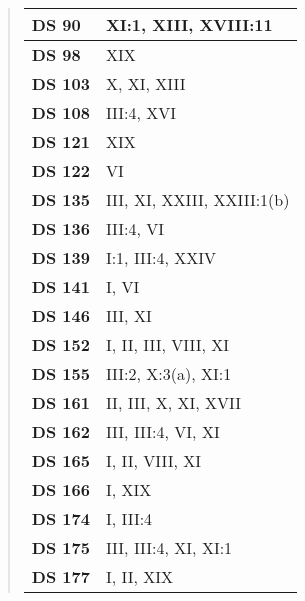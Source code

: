 \begin{quote}
\begin{xltabular}{\linewidth}{ l | X }
        \textbf {DS 90} & XI:1, XIII, XVIII:11 \\ \hline
    
        \textbf {DS 98} & XIX \\ \hline
    
        \textbf {DS 103} & X, XI, XIII \\ \hline
    
        \textbf {DS 108} & III:4, XVI \\ \hline
    
        \textbf {DS 121} & XIX \\ \hline
    
        \textbf {DS 122} & VI \\ \hline
    
        \textbf {DS 135} & III, XI, XXIII, XXIII:1(b) \\ \hline
    
        \textbf {DS 136} & III:4, VI \\ \hline
    
        \textbf {DS 139} & I:1, III:4, XXIV \\ \hline
    
        \textbf {DS 141} & I, VI \\ \hline
    
        \textbf {DS 146} & III, XI \\ \hline
    
        \textbf {DS 152} & I, II, III, VIII, XI \\ \hline
    
        \textbf {DS 155} & III:2, X:3(a), XI:1 \\ \hline
    
        \textbf {DS 161} & II, III, X, XI, XVII \\ \hline
    
        \textbf {DS 162} & III, III:4, VI, XI \\ \hline
    
        \textbf {DS 165} & I, II, VIII, XI \\ \hline
    
        \textbf {DS 166} & I, XIX \\ \hline
    
        \textbf {DS 174} & I, III:4 \\ \hline
    
        \textbf {DS 175} & III, III:4, XI, XI:1 \\ \hline
    
        \textbf {DS 177} & I, II, XIX \\ \hline
    

\end{xltabular}
\end{quote}
